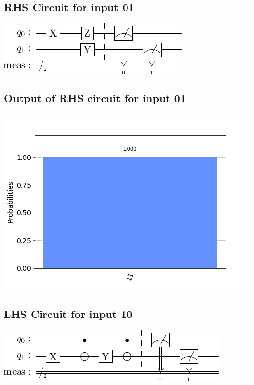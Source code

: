 \documentclass[a4paper]{article}
\begin{document}
\begin{answer}[Qeusiton 1 b (c)]
        \subsection*{RHS Circuit for input 01}
        \includegraphics[scale=0.5]{c201.png}
        \subsection*{Output of RHS circuit for input 01}
        \includegraphics[scale = 0.5]{c201-out.png}
        \subsection*{LHS Circuit for input 10}
        \includegraphics[scale=0.5]{c110.png}

\end{answer}
\end{document}
